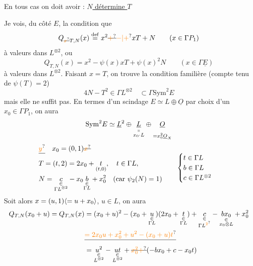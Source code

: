 En tous cas on doit avoir : \uline{$N$ détermine $T$}

Je vois, du côté $E$, la condition que
\[
Q_{\deleted{\unsure{x}}T,N}(x)\overset{\mathrm{def}}=x^2\deleted{\unsure{+}}\unsure{-|+}xT+N\qquad(x\in\Gamma P_1)
\]
à valeurs dans $L^{\otimes2}$, ou 
\[
Q_{T,N}(x)=x^2-\psi(x)xT+\psi(x)^2N\qquad(x\in\Gamma\underline E)
\]
à valeurs dans $L^{\otimes2}$. Faisant $x=T$, on trouve la condition familière (compte tenu de $\psi(T)=2$)
\[
4N-T^2\in\Gamma L^{\otimes2}\quad\subset\Gamma\mathrm{Sym}^2 E
\]
mais elle ne suffit pas. En termes d'un scindage $E\simeq L\oplus\underline O$ par choix d'un $x_0\in\Gamma P_1$, on aura
\[
\mathrm{Sym}^2E\simeq\underline L^2\oplus\underset{\substack{\shortparallel\\x_0\cdot L}}{\underline L}\oplus\underset{\substack{\phantom{\shortparallel}\\=x_0^2\underline O_X}}{\underline O}
\]
\[
\begin{aligned}&\deleted{\unsure{y}}\quad x_0=(0,1)\deleted{\unsure{x}}\\ &T=(t,2)=2x_0+\underset{(t,0)}t,\quad t\in\Gamma L,\\ &N=\underset{\substack{\in\\\Gamma L^{\otimes2}}}c-x_0\underset{\substack{\in\\\Gamma L}}b+x_0^2\quad(\text{car }\psi_2(N)=1)\end{aligned}\qquad\begin{cases}t\in\Gamma L\\ b\in\Gamma L\\c\in\Gamma L^{\otimes2}\end{cases}
\]
Soit alors $x=(u,1)\inserted{=u+x_0}$, $u\in L$, on aura
\[
\begin{aligned}Q_{T,N}(x_0+u)=Q_{T,N}(x)&=(x_0+u)^2-(x_0+\underset{\substack{\in\\\Gamma L}}u)(2x_0+\underset{\substack{\in\\\Gamma L}}t)+\underset{\substack{\in\\\Gamma L^{\unsure{2}}}}c-\underset{\substack{\in\\x_0\otimes L}}{bx_0}+x_0^2\\ &\deleted{\unsure{=2x_0u+x_0^2+u^2-(x_0+u)t}}\\ &=\underset{\substack{\in\\L^{\otimes2}}}{u^2}-\underset{\substack{\in\\L^{\otimes2}}}{ut}+\deleted{\unsure{x_0^2+}}(-bx_0+c-x_0t)\end{aligned}
\]

